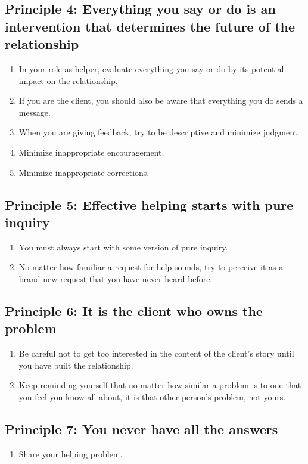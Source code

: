\documentclass{article}
\newenvironment{nosepenumerate}
{ \begin{enumerate}
    \setlength{\itemsep}{0pt}
    \setlength{\parskip}{0pt}
    \setlength{\parsep}{0pt}     }
{ \end{enumerate}                  }
\begin{document}
\begin{multicols}{2}
\subsection{Principle 4: Everything you say or do is an intervention that determines the future of the relationship}
\begin{nosepenumerate}
    \item In your role as helper, evaluate everything you say or do by its potential impact on the relationship.
    \item If you are the client, you should also be aware that everything you do sends a message.
    \item When you are giving feedback, try to be descriptive and minimize judgment.
    \item Minimize inappropriate encouragement.
    \item Minimize inappropriate corrections.
\end{nosepenumerate}

\subsection{Principle 5: Effective helping starts with pure inquiry}
\begin{nosepenumerate}
    \item You must always start with some version of pure inquiry.
    \item No matter how familiar a request for help sounds, try to perceive it as a brand new request that you have never heard before.
\end{nosepenumerate}

\subsection{Principle 6: It is the client who owns the problem}
\begin{nosepenumerate}
    \item Be careful not to get too interested in the content of the client’s story until you have built the relationship.
    \item Keep reminding yourself that no matter how similar a problem is to one that you feel you know all about, it is that other person’s problem, not yours.
\end{nosepenumerate}

\subsection{Principle 7: You never have all the answers}
\begin{nosepenumerate}
    \item Share your helping problem.
\end{nosepenumerate}

\end{multicols}
\end{document}
